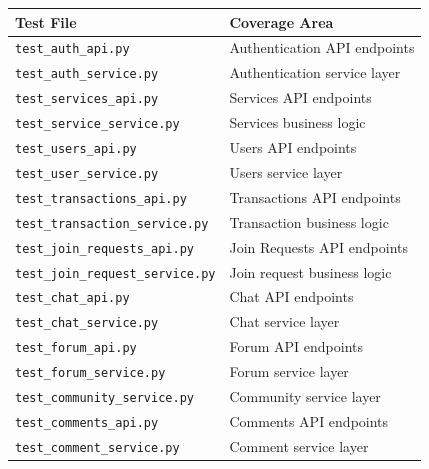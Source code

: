 \documentclass[11pt,a4paper]{report}
\begin{document}
\begin{table}[h]
    \centering
    \begin{tabularx}{\textwidth}{|l|X|}
        \hline
        \textbf{Test File}                       & \textbf{Coverage Area}       \\
        \hline
        \texttt{test\_auth\_api.py}              & Authentication API endpoints \\
        \hline
        \texttt{test\_auth\_service.py}          & Authentication service layer \\
        \hline
        \texttt{test\_services\_api.py}          & Services API endpoints       \\
        \hline
        \texttt{test\_service\_service.py}       & Services business logic      \\
        \hline
        \texttt{test\_users\_api.py}             & Users API endpoints          \\
        \hline
        \texttt{test\_user\_service.py}          & Users service layer          \\
        \hline
        \texttt{test\_transactions\_api.py}      & Transactions API endpoints   \\
        \hline
        \texttt{test\_transaction\_service.py}   & Transaction business logic   \\
        \hline
        \texttt{test\_join\_requests\_api.py}    & Join Requests API endpoints  \\
        \hline
        \texttt{test\_join\_request\_service.py} & Join request business logic  \\
        \hline
        \texttt{test\_chat\_api.py}              & Chat API endpoints           \\
        \hline
        \texttt{test\_chat\_service.py}          & Chat service layer           \\
        \hline
        \texttt{test\_forum\_api.py}             & Forum API endpoints          \\
        \hline
        \texttt{test\_forum\_service.py}         & Forum service layer          \\
        \hline
        \texttt{test\_community\_service.py}     & Community service layer      \\
        \hline
        \texttt{test\_comments\_api.py}          & Comments API endpoints       \\
        \hline
        \texttt{test\_comment\_service.py}       & Comment service layer        \\

\end{tabularx}
\end{table}
\end{document}
